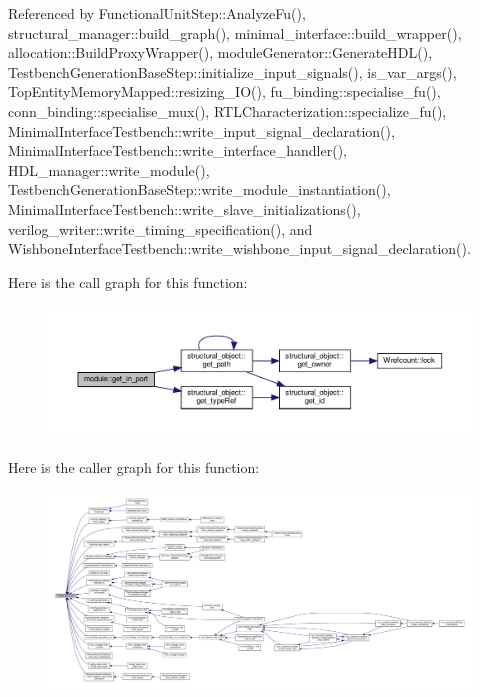 Referenced by Functional\+Unit\+Step\+::\+Analyze\+Fu(), structural\+\_\+manager\+::build\+\_\+graph(), minimal\+\_\+interface\+::build\+\_\+wrapper(), allocation\+::\+Build\+Proxy\+Wrapper(), module\+Generator\+::\+Generate\+H\+D\+L(), Testbench\+Generation\+Base\+Step\+::initialize\+\_\+input\+\_\+signals(), is\+\_\+var\+\_\+args(), Top\+Entity\+Memory\+Mapped\+::resizing\+\_\+\+I\+O(), fu\+\_\+binding\+::specialise\+\_\+fu(), conn\+\_\+binding\+::specialise\+\_\+mux(), R\+T\+L\+Characterization\+::specialize\+\_\+fu(), Minimal\+Interface\+Testbench\+::write\+\_\+input\+\_\+signal\+\_\+declaration(), Minimal\+Interface\+Testbench\+::write\+\_\+interface\+\_\+handler(), H\+D\+L\+\_\+manager\+::write\+\_\+module(), Testbench\+Generation\+Base\+Step\+::write\+\_\+module\+\_\+instantiation(), Minimal\+Interface\+Testbench\+::write\+\_\+slave\+\_\+initializations(), verilog\+\_\+writer\+::write\+\_\+timing\+\_\+specification(), and Wishbone\+Interface\+Testbench\+::write\+\_\+wishbone\+\_\+input\+\_\+signal\+\_\+declaration().

Here is the call graph for this function\+:
\nopagebreak
\begin{figure}[H]
\begin{center}
\leavevmode
\includegraphics[width=350pt]{d0/dd3/classmodule_a0e39b683ccf93e8a47bb227430ed3233_cgraph}
\end{center}
\end{figure}
Here is the caller graph for this function\+:
\nopagebreak
\begin{figure}[H]
\begin{center}
\leavevmode
\includegraphics[width=350pt]{d0/dd3/classmodule_a0e39b683ccf93e8a47bb227430ed3233_icgraph}
\end{center}
\end{figure}
\mbox{\label{classmodule_aea3a2e04dfd2a7bd0c9e978d9d1b2454}} 
